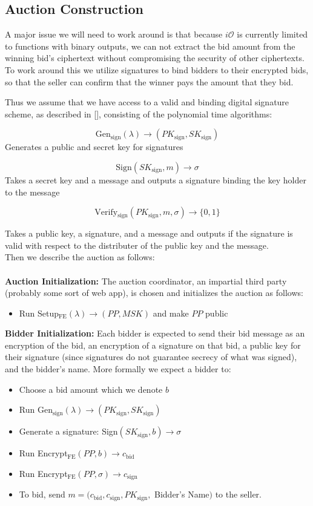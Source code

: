 \documentclass[12pt,twoside]{reedthesis}
\begin{document}
    \subsection{Auction Construction}
    \newcommand{\sign}[0]{_\text{sign}}
    \par A major issue we will need to work around is that because $i\mathcal{O}$ is currently limited to functions with binary outputs, we can not extract the bid amount from the winning bid's ciphertext without compromising the security of other ciphertexts. To work around this we utilize signatures to bind bidders to their encrypted bids, so that the seller can confirm that the winner pays the amount that they bid.
    \par Thus we assume that we have access to a valid and binding digital signature scheme, as described in [\cite{Katz:2007:IMC:1206501}], consisting of the polynomial time algorithms: 
    
    
    
    $$\text{Gen$_\text{sign}(\lambda) \to (PK\sign,SK\sign)$}$$ 
Generates a public and secret key for signatures
    
    
    
    $$\text{Sign$(SK\sign,m) \to \sigma$}$$ 
    Takes a secret key and a message and outputs a signature binding the key holder to the message
    
    $$\text{Verify$\sign(PK\sign,m,\sigma)\to \{0,1\}$}$$
    
    Takes a public key, a signature, and a message and outputs if the signature is valid with respect to the distributer of the public key and the message. \\
    Then we describe the auction as follows: \\ \\
        \textbf{Auction Initialization:} The auction coordinator, an impartial third party (probably some sort of web app), is chosen and initializes the auction as follows:
    \begin{itemize}
    \item Run Setup$_\text{FE}(\lambda)\to (PP,MSK)$ and make $PP$ public
    \end{itemize}
%
%
%
    \textbf{Bidder Initialization:} Each bidder is expected to send their bid message as an encryption of the bid, an encryption of a signature on that bid, a public key for their signature (since signatures do not guarantee secrecy of what was signed), and the bidder's name. More formally we expect a bidder to:
     \begin{itemize}
     \item Choose a bid amount which we denote $b$
     \item Run Gen$\sign(\lambda) \to (PK\sign,SK\sign)$
     \item Generate a signature: Sign$(SK\sign,b)\to \sigma$
     \item Run Encrypt$_\text{FE}(PP,b) \to c_\text{bid}$
     \item Run  Encrypt$_\text{FE}(PP,\sigma)\to c\sign$
     \item To bid, send $m = (c_\text{bid},c\sign,PK\sign,$ Bidder's Name$)$ to the seller.
     \end{itemize} 
     
\end{document}
